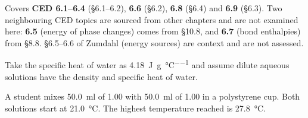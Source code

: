 \documentclass{apchem-exam}
\begin{document}
\apctitleblock

\begin{apcnote}[Scope]
Covers \textbf{CED 6.1--6.4} (\S6.1--6.2), \textbf{6.6} (\S6.2),
\textbf{6.8} (\S6.4) and \textbf{6.9} (\S6.3). Two neighbouring CED
topics are sourced from other chapters and are not examined here:
\textbf{6.5} (energy of phase changes) comes from \S10.8, and
\textbf{6.7} (bond enthalpies) from \S8.8. \S6.5--6.6 of Zumdahl (energy
sources) are context and are not assessed.

Take the specific heat of water as
\SI{4.18}{\joule\per\gram\per\celsius} and assume dilute aqueous
solutions have the density and specific heat of water.
\end{apcnote}



A student mixes \SI{50.0}{\milli\litre} of \SI{1.00}{\Molar} 
with \SI{50.0}{\milli\litre} of \SI{1.00}{\Molar}  in a
polystyrene cup. Both solutions start at \SI{21.0}{\celsius}. The highest
temperature reached is \SI{27.8}{\celsius}.
\end{document}
